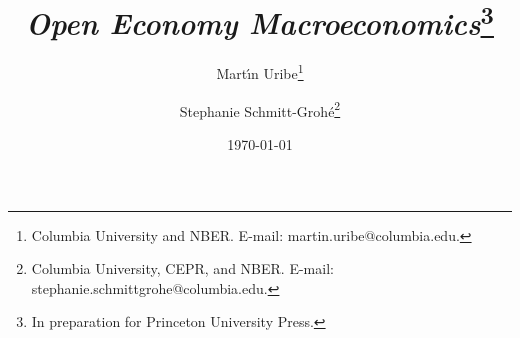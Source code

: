 \documentclass[11pt]{book}
\title{{\Huge \itshape  Open Economy Macroeconomics}\thanks{In preparation for  Princeton University Press.}}
\author{
Mart\'{\i}n Uribe\thanks{Columbia University and NBER.  E-mail: martin.uribe@columbia.edu.} \and
Stephanie Schmitt-Groh\'e\thanks{Columbia University, CEPR, and NBER. E-mail: stephanie.schmittgrohe@columbia.edu.}}
\date{\today\\
}
\begin{document}

\doublespacing


















\end{document}
